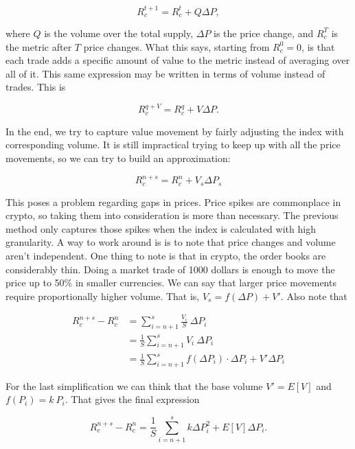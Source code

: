 \documentclass[11pt,a4paper]{article}
\begin{document}
$$
R_c^{t+1} = R_c^{t} + Q \Delta P,
$$

where $Q$ is the volume over the total supply, $\Delta P$ is the price change, and $R_c^{T}$ is the metric after $T$ price changes. What this says, starting from $R_c^{0} = 0$, is that each trade adds a specific amount of value to the metric instead of averaging over all of it. This same expression may be written in terms of volume instead of trades. This is

$$
R_c^{q+V} = R_c^{q} + V \Delta P.
$$

In the end, we try to capture value movement by fairly adjusting the index with corresponding volume. It is still impractical trying to keep up with all the price movements, so we can try to build an approximation:

$$
R_c^{n+s} = R_c^{n} + V_{s} \Delta P_{s}
$$

This poses a problem regarding gaps in prices. Price spikes are commonplace in crypto, so taking them into consideration is more than necessary. The previous method only captures those spikes when the index is calculated with high granularity. A way to work around is is to note that price changes and volume aren't independent. One thing to note is that in crypto, the order books are considerably thin. Doing a market trade of 1000 dollars is enough to move the price up to 50\% in smaller currencies. We can say that larger price movements require proportionally higher volume. That is, $V_{s} = f(\Delta P) + V'$. Also note that

\begin{equation}
\begin{split}
R_c^{n+s} - R_c^{n} &= \sum_{i=n+1}^{s} \frac{V_i}{S}\ \Delta P_i \\
  &= \frac{1}{S} \sum_{i=n+1}^{s} V_i\ \Delta P_i \\
  &= \frac{1}{S} \sum_{i=n+1}^{s} f( \Delta P_i )  \cdot \Delta P_i + V' \Delta P_i
\end{split}
\end{equation}

For the last simplification we can think that the base volume $V' = E[V]$ and $f(P_i) = k\ P_i$. That gives the final expression

$$
R_c^{n+s} - R_c^{n} = \frac{1}{S} \sum_{i=n+1}^{s} k \Delta P_i^2  + E \left[ V \right] \Delta P_i.
$$
\end{document}

